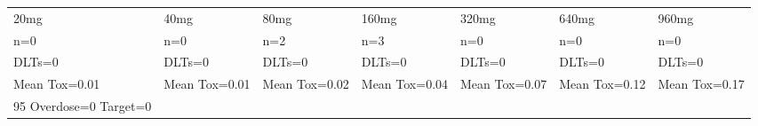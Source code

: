 \documentclass[12pt]{article}
\begin{document}
\thispagestyle{empty}
\begin{table}[ht]
\centering
\begingroup\normalsize
\begin{tabular}{lllllll}
  \hline
  \hline
\cellcolor{brightgreen}20mg & \cellcolor{brightgreen}40mg & \cellcolor{brightgreen}80mg & \cellcolor{brightgreen}160mg & \cellcolor{brightgreen}320mg & \cellcolor{brightgreen}640mg & \cellcolor{brightgreen}960mg \\ 
  n=0 & n=0 & n=2 & n=3 & n=0 & n=0 & n=0 \\ 
  DLTs=0 & DLTs=0 & DLTs=0 & DLTs=0 & DLTs=0 & DLTs=0 & DLTs=0 \\ 
  Mean Tox=0.01 & Mean Tox=0.01 & Mean Tox=0.02 & Mean Tox=0.04 & Mean Tox=0.07 & Mean Tox=0.12 & Mean Tox=0.17 \\ 
  95%
  Overdose=0%
  Target=0%
   \hline
\end{tabular}
\endgroup
\end{table}
\end{document}
